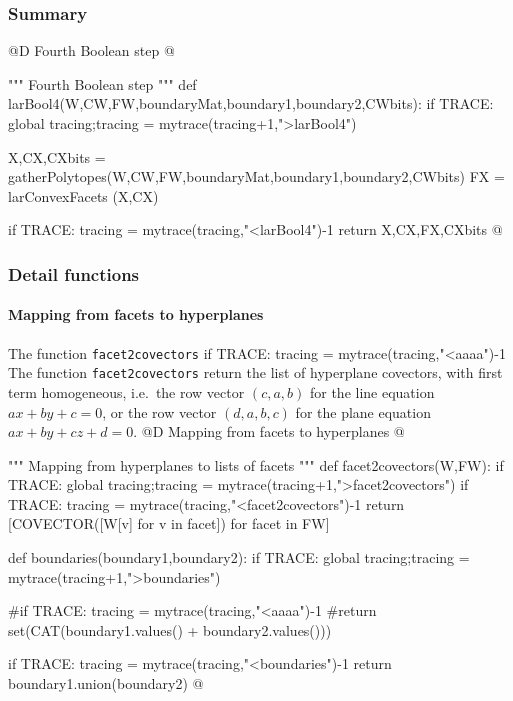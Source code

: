 \documentclass[11pt,oneside]{article}	%
\begin{document}
\subsubsection{Summary}


@D Fourth Boolean step
@{""" Fourth Boolean step """
def larBool4(W,CW,FW,boundaryMat,boundary1,boundary2,CWbits):
	if TRACE: global tracing;tracing = mytrace(tracing+1,">larBool4")

	X,CX,CXbits = gatherPolytopes(W,CW,FW,boundaryMat,boundary1,boundary2,CWbits)
	FX = larConvexFacets (X,CX)

	if TRACE: tracing = mytrace(tracing,"<larBool4")-1
	return X,CX,FX,CXbits
@}


\subsubsection{Detail functions}




\paragraph{Mapping from facets to hyperplanes}

The function \texttt{facet2covectors} if TRACE: tracing = mytrace(tracing,"<aaaa")-1
The function \texttt{facet2covectors} return the list of hyperplane covectors, with first term homogeneous, i.e.~the row vector $(c,a,b)$ for the line equation $ax+by+c=0$, or the row vector $(d,a,b,c)$ for the plane equation $ax+by+cz+d=0$.
@D Mapping from facets to hyperplanes
@{""" Mapping from hyperplanes to lists of facets """
def facet2covectors(W,FW):
	if TRACE: global tracing;tracing = mytrace(tracing+1,">facet2covectors")
	if TRACE: tracing = mytrace(tracing,"<facet2covectors")-1
	return [COVECTOR([W[v] for v in facet]) for facet in FW]

def boundaries(boundary1,boundary2):
	if TRACE: global tracing;tracing = mytrace(tracing+1,">boundaries")

	#if TRACE: tracing = mytrace(tracing,"<aaaa")-1
	#return set(CAT(boundary1.values() + boundary2.values()))

	if TRACE: tracing = mytrace(tracing,"<boundaries")-1
	return boundary1.union(boundary2)
@}
\end{document}
